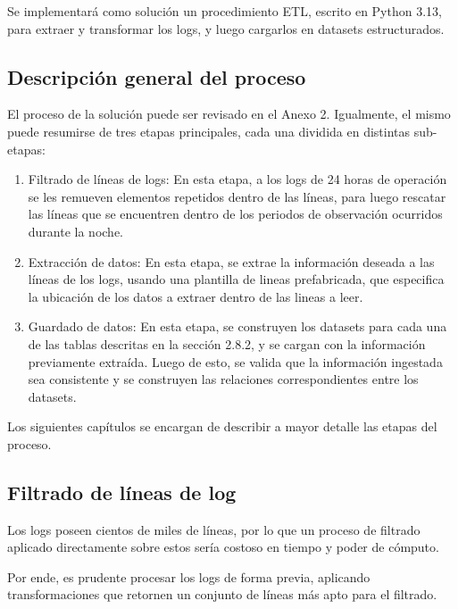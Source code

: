 
Se implementará como solución un procedimiento ETL, escrito en Python 3.13, para extraer y transformar los logs, y luego cargarlos en datasets estructurados.

\subsection{Descripción general del proceso}

El proceso de la solución puede ser revisado en el Anexo 2. Igualmente, el mismo puede resumirse de tres etapas principales, cada una dividida en distintas sub-etapas: 

\begin{enumerate}
    \item Filtrado de líneas de logs:
    En esta etapa, a los logs de 24 horas de operación se les remueven elementos repetidos dentro de las líneas, para luego rescatar las líneas que se encuentren dentro de los periodos de observación ocurridos durante la noche.

    \item Extracción de datos:
    En esta etapa, se extrae la información deseada a las líneas de los logs, usando una plantilla de lineas prefabricada, que especifica la ubicación de los datos a extraer dentro de las lineas a leer.

    \item Guardado de datos:
    En esta etapa, se construyen los datasets para cada una de las tablas descritas en la sección 2.8.2, y se cargan con la información previamente extraída. Luego de esto, se valida que la información ingestada sea consistente y se construyen las relaciones correspondientes entre los datasets.
\end{enumerate}

Los siguientes capítulos se encargan de describir a mayor detalle las etapas del proceso.

\subsection{Filtrado de líneas de log}

Los logs poseen cientos de miles de líneas, por lo que un proceso de filtrado aplicado directamente sobre estos sería costoso en tiempo y poder de cómputo.

Por ende, es prudente procesar los logs de forma previa, aplicando transformaciones que retornen un conjunto de líneas más apto para el filtrado.

